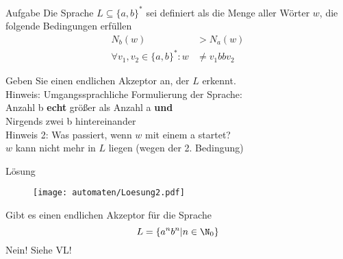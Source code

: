 \begin{frame}{Aufgabe}
	Die Sprache $L\subseteq \{a,b\}^* $ sei definiert als die Menge aller Wörter $w$, die folgende Bedingungen erfüllen 
	\begin{align*}
		N_b(w) &> N_a(w)  \\ \forall v_1,v_2 \in \{a,b\}^* : w &\neq v_1 bb v_2 
	\end{align*}

	Geben Sie einen endlichen Akzeptor an, der $L$ erkennt. \\
	
	\bigskip
	\pause
	Hinweis: Umgangssprachliche Formulierung der Sprache:\\ \pause
	Anzahl b \textbf{echt} größer als Anzahl a \textbf{und}\\
	Nirgends zwei b hintereinander\\
	
	\medskip
	\pause
	Hinweis 2: Was passiert, wenn $w$ mit einem a startet?\\ \pause
	$w$ kann nicht mehr in $L$ liegen (wegen der 2. Bedingung)
\end{frame}

\begin{frame}{Lösung}
	\begin{figure}
		\centering
		\texttt{[image: automaten/Loesung2.pdf]}
	\end{figure}
\end{frame}

\begin{frame}
	Gibt es einen endlichen Akzeptor für die Sprache $$L = \{ a^n b^n | n \in \N_0 \}$$
	\pause
	Nein! Siehe VL!
\end{frame}